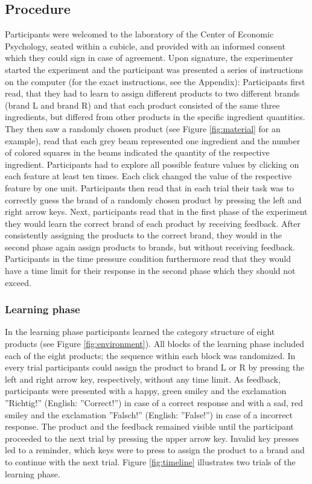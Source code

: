 \documentclass[a4paper,man,natbib]{apa6}
\begin{document}
\subsection{Procedure}
Participants were welcomed to the laboratory of the Center of Economic Psychology, seated within a cubicle, and provided with an informed consent which they could sign in case of agreement. Upon signature, the experimenter started the experiment and the participant was presented a series of instructions on the computer (for the exact instructions, see the Appendix): Participants first read, that they had to learn to assign different products to two different brands (brand L and brand R) and that each product consisted of the same three ingredients, but differed from other products in the specific ingredient quantities. They then saw a randomly chosen product (see Figure \ref{fig:material} for an example), read that each grey beam represented one ingredient and the number of colored squares in the beams indicated the quantity of the respective ingredient. Participants had to explore all possible feature values by clicking on each feature at least ten times. Each click changed the value of the respective feature by one unit. Participants then read that in each trial their task was to correctly guess the brand of a randomly chosen product by pressing the left and right arrow keys. Next, participants read that in the first phase of the experiment they would learn the correct brand of each product by receiving feedback. After consistently assigning the products to the correct brand, they would in the second phase again assign products to brands, but without receiving feedback. Participants in the time pressure condition furthermore read that they would have a time limit for their response in the second phase which they should not exceed.

\subsubsection{Learning phase}
In the learning phase participants learned the category structure of eight products (see Figure \ref{fig:environment}). All blocks of the learning phase included each of the eight products; the sequence within each block was randomized. In every trial participants could assign the product to brand L or R by pressing the left and right arrow key, respectively, without any time limit. As feedback, participants were presented with a happy, green smiley and the exclamation ''Richtig!'' (English: ''Correct!'') in case of a correct response and with a sad, red smiley and the exclamation ''Falsch!'' (English: ''False!'') in case of a incorrect response. The product and the feedback remained visible until the participant proceeded to the next trial by pressing the upper arrow key. 
Invalid key presses led to a reminder, which keys were to press to assign the product to a brand and to continue with the next trial. 
Figure \ref{fig:timeline} illustrates two trials of the learning phase.
\end{document}
